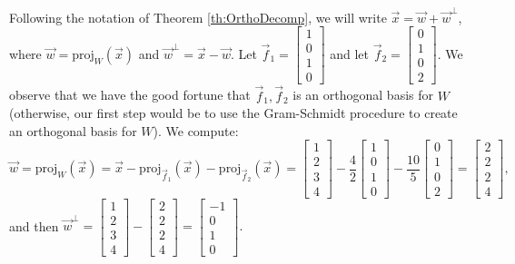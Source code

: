 \documentclass{ximera}
\begin{document}
\begin{example}
  \begin{explanation}
   Following the notation of Theorem \ref{th:OrthoDecomp}, we will write $\vec{x} = \vec{w} + \vec{w}^\perp$, where $\vec{w}=\mbox{proj}_W(\vec{x})$ and $\vec{w}^\perp = \vec{x} - \vec{w}$.  Let $\vec{f}_1=\begin{bmatrix}
  1 \\ 0 \\ 1 \\ 0
  \end{bmatrix}$ and let $\vec{f}_2=\begin{bmatrix}
  0 \\ 1 \\ 0 \\ 2
  \end{bmatrix}$.  We observe that we have the good fortune that $\vec{f}_1,\vec{f}_2$ is an orthogonal basis for $W$ (otherwise, our first step would be to use the Gram-Schmidt procedure to create an orthogonal basis for $W$).  We compute:
$$\vec{w}=\mbox{proj}_W(\vec{x})
      =\vec{x}-\mbox{proj}_{\vec{f}_1}(\vec{x})-\mbox{proj}_{\vec{f}_2}(\vec{x})
      = \begin{bmatrix}
  1 \\ 2 \\ 3 \\ 4
  \end{bmatrix} - \frac{4}{2}\begin{bmatrix}
  1 \\ 0 \\ 1 \\ 0
  \end{bmatrix} - \frac{10}{5}\begin{bmatrix}
  0 \\ 1 \\ 0 \\ 2
  \end{bmatrix} = \begin{bmatrix}
  2 \\ 2 \\ 2 \\ 4
  \end{bmatrix},$$
  and then $\vec{w}^\perp=\begin{bmatrix}
  1 \\ 2 \\ 3 \\ 4
  \end{bmatrix} - \begin{bmatrix}
  2 \\ 2 \\ 2 \\ 4
  \end{bmatrix} = \begin{bmatrix}
  -1 \\ 0 \\ 1 \\ 0
  \end{bmatrix}.$


\end{explanation}
\end{example}
\end{document}

